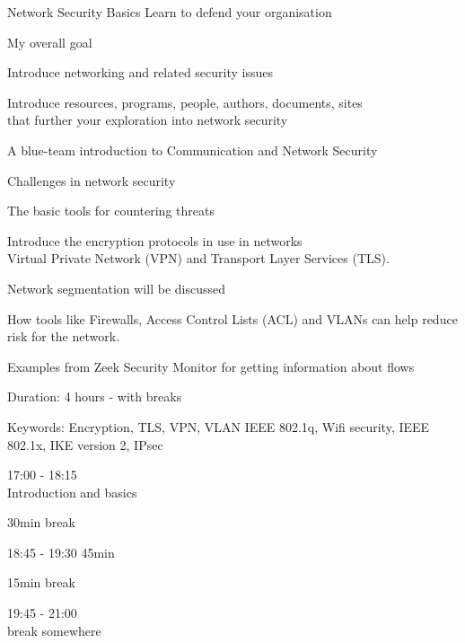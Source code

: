 \documentclass[Screen16to9,17pt]{foils}
\begin{document}
\mytitlepage
{Network Security Basics}
{Learn to defend your organisation}

\hlkprofiluk



My overall goal

\begin{list2}
\item Introduce networking and related security issues
\item Introduce resources, programs, people, authors, documents, sites\\
 that further your exploration into network security
\end{list2}


A blue-team introduction to Communication and Network Security
\begin{list2}
\item Challenges in network security
\item The basic tools for countering threats
\item Introduce the encryption protocols in use in networks\\
Virtual Private Network (VPN) and Transport Layer Services (TLS).
\item Network segmentation will be discussed

\item How tools like Firewalls, Access Control Lists (ACL) and VLANs can help reduce risk for the network.
\item Examples from Zeek Security Monitor for getting information about flows
\end{list2}

Duration: 4 hours - with breaks

Keywords: Encryption, TLS, VPN, VLAN IEEE 802.1q, Wifi security, IEEE
802.1x, IKE version 2, IPsec




\begin{list2}
\item 17:00 - 18:15\\
Introduction and basics
\item 30min break\\

\item 18:45 - 19:30 45min\\

\item 15min break\\

\item 19:45 - 21:00\\
break somewhere
\end{list2}
\end{document}

